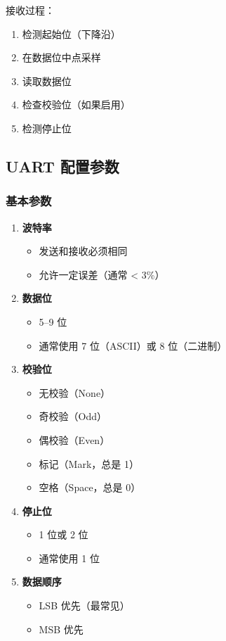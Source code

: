 接收过程：
\begin{enumerate}
  \item 检测起始位（下降沿）
  \item 在数据位中点采样
  \item 读取数据位
  \item 检查校验位（如果启用）
  \item 检测停止位
\end{enumerate}

\subsection{UART 配置参数}

\subsubsection{基本参数}

\begin{enumerate}
  \item \textbf{波特率}
    \begin{itemize}
      \item 发送和接收必须相同
      \item 允许一定误差（通常 < 3\%）
    \end{itemize}

  \item \textbf{数据位}
    \begin{itemize}
      \item 5--9 位
      \item 通常使用 7 位（ASCII）或 8 位（二进制）
    \end{itemize}

  \item \textbf{校验位}
    \begin{itemize}
      \item 无校验（None）
      \item 奇校验（Odd）
      \item 偶校验（Even）
      \item 标记（Mark，总是 1）
      \item 空格（Space，总是 0）
    \end{itemize}

  \item \textbf{停止位}
    \begin{itemize}
      \item 1 位或 2 位
      \item 通常使用 1 位
    \end{itemize}

  \item \textbf{数据顺序}
    \begin{itemize}
      \item LSB 优先（最常见）
      \item MSB 优先
    \end{itemize}
\end{enumerate}

